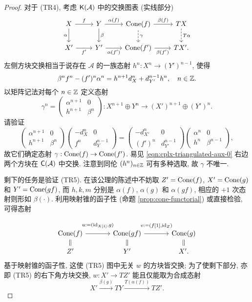 \begin{proof}
	对于 (TR4), 考虑 $\mathsf{K}(\mathcal{A})$ 中的交换图表 (实线部分)
	\begin{equation}\label{eqn:cplx-triangulated-aux-0}\begin{tikzcd}
		X \arrow[d, "\alpha"'] \arrow[r, "f"] & Y \arrow[r, "\alpha(f)"] \arrow[d, "\beta"] & \Cone(f) \arrow[r, "\beta(f)"] \arrow[dashed, d, "\gamma"] & TX \arrow[dashed, d, "T\alpha"] \\
		X' \arrow[r, "{f'}"'] & Y' \arrow[r, "{\alpha(f')}"'] & \Cone(f') \arrow[r, "{\beta(f')}"'] & T X' .
	\end{tikzcd}\end{equation}
	左侧方块交换相当于说存在 $\mathcal{A}$ 的一族态射 $h^n: X^n \to (Y')^{n-1}$, 使得
	\[ \beta^n f^n - (f')^n \alpha^n = h^{n+1} d_X^n + d_{Y'}^{n-1} h^n , \quad n \in \mathbb{Z} . \]
	以矩阵记法对每个 $n \in \mathbb{Z}$ 定义态射
	\[ \gamma^n = \begin{pmatrix} \alpha^{n+1} & 0 \\ h^{n+1} & \beta^n \end{pmatrix} : X^{n+1} \oplus Y^n \to (X')^{n+1} \oplus (Y')^n . \]
	请验证
	\[ \begin{pmatrix} \alpha^{n+1} & 0 \\ h^{n+1} & \beta^n \end{pmatrix} \begin{pmatrix} -d_X^n & 0 \\ f^n & d_Y^{n-1} \end{pmatrix}
	= \begin{pmatrix} -d_{X'}^n & 0 \\ (f')^n & d_{Y'}^{n-1} \end{pmatrix} \begin{pmatrix} \alpha^n & 0 \\ h^n & \beta^{n-1} \end{pmatrix}, \]
	故它们确定态射 $\gamma: \operatorname{Cone}(f) \to \operatorname{Cone}(f')$. 易见 \eqref{eqn:cplx-triangulated-aux-0} 右边两个方块在 $\mathsf{C}(\mathcal{A})$ 中交换. 注意到同伦 $(h^n)_{n \in \mathbb{Z}}$ 可有多种选取, 故 $\gamma$ 不唯一.
	
	剩下的任务是验证 (TR5). 在该公理的陈述中不妨取 $Z' = \operatorname{Cone}(f)$, $X' = \operatorname{Cone}(g)$ 和 $Y' = \operatorname{Cone}(gf)$, 而 $h, k, m$ 分别是 $\alpha(f)$, $\alpha(g)$ 和 $\alpha(gf)$, 相应的 $+1$ 次态射则形如 $\beta(\cdot)$. 利用映射锥的函子性 (命题 \ref{prop:cone-functorial}) 或直接检验, 可得态射
	\[\begin{tikzcd}[column sep=large, row sep=small]
		\Cone(f) \arrow[r, "{u := (\identity_{X[1]}, g)}" inner sep=0.8em] & \Cone(gf) \arrow[r, "{v := (f[1], \identity_Z)}" inner sep=0.8em] & \Cone(g) \\
		Z' \arrow[equal, u] & Y' \arrow[equal, u] & X' \arrow[equal, u] .
	\end{tikzcd}\]
	基于映射锥的函子性, 这使 (TR5) 图中无关 $w$ 的方块皆交换; 为了使剩下部分, 亦即 (TR5) 的右下角方块交换, $w: X' \to TZ'$ 能且仅能取为合成态射
	\[ X' \xrightarrow{\beta(g)} TY \xrightarrow{T(\alpha(f))} T Z' . \]


\end{proof}
